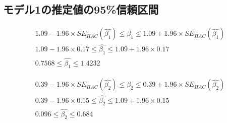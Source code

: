 \documentclass{article}
\begin{document}
\subsection{モデル1の推定値の95\%信頼区間}

\begin{centering}
  \begin{gather}
    1.09 - 1.96 \times SE_{HAC}(\hat{\beta_1}) \le \hat{\beta_1} \le 1.09 + 1.96 \times SE_{HAC}(\hat{\beta_1}) \\
    1.09 - 1.96 \times 0.17 \le \hat{\beta_1} \le 1.09 + 1.96 \times 0.17 \\
    0.7568 \le \hat{\beta_1} \le 1.4232
  \end{gather}
\end{centering}

\begin{centering}
  \begin{gather}
    0.39 - 1.96 \times SE_{HAC}(\hat{\beta_2}) \le \hat{\beta_2} \le 0.39 + 1.96 \times SE_{HAC}(\hat{\beta_2}) \\
    0.39 - 1.96 \times 0.15 \le \hat{\beta_2} \le 1.09 + 1.96 \times 0.15 \\
    0.096 \le \hat{\beta_2} \le 0.684
  \end{gather}
\end{centering}
\end{document}

